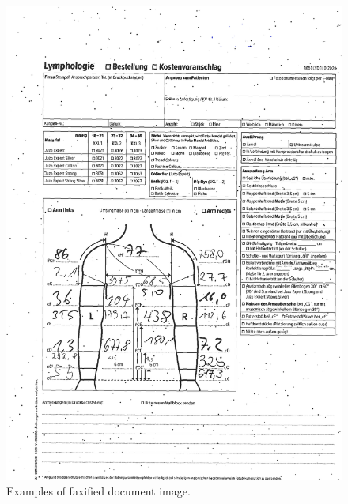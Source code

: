 \begin{figure}[H]
        \vspace*{1cm}
        \begin{center}
	    \includegraphics[scale=0.32]{images/FaxifiedImage.png}
	    \caption[Examples of faxified document image.]{Examples of faxified document image.}
	    \label{fig:FaxifiedImage}
	    \end{center}
\end{figure}



